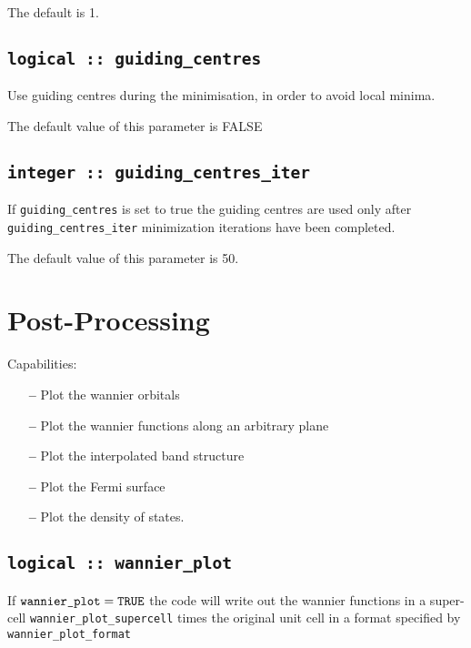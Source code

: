 The default is 1.
                                                                                                                              



\subsection[guiding\_centres]{\tt logical :: guiding\_centres}
Use guiding centres during the minimisation, in order to avoid
local minima.

The default value of this parameter is FALSE

\subsection[guiding\_centres\_iter]{\tt integer :: guiding\_centres\_iter}

If \verb#guiding_centres# is set to true the
guiding centres are used only after \verb#guiding_centres_iter# minimization iterations
have been completed.

The default value of this parameter is 50.




\section{Post-Processing}

 Capabilities:

\begin{itemize}
\item[{\bf --}]  Plot the wannier orbitals			     
\item[{\bf --}]  Plot the wannier functions along an arbitrary plane  
\item[{\bf --}]  Plot the interpolated band structure 		     
\item[{\bf --}]  Plot the Fermi surface 			     
\item[{\bf --}]  Plot the density of states.
\end{itemize}


\subsection[wannier\_plot]{\tt logical :: wannier\_plot}

If $\verb#wannier_plot#=\verb#TRUE#$ the code will write out the
wannier functions in a super-cell \verb#wannier_plot_supercell# times
the original unit cell in a format specified by \verb#wannier_plot_format#

